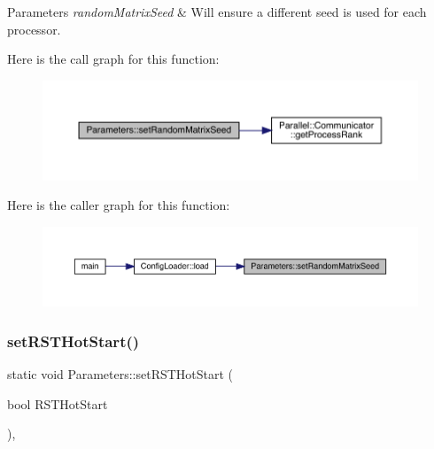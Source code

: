 \begin{DoxyParams}{Parameters}
{\em random\+Matrix\+Seed} & Will ensure a different seed is used for each processor. \\
\hline
\end{DoxyParams}
Here is the call graph for this function\+:\nopagebreak
\begin{figure}[H]
\begin{center}
\leavevmode
\includegraphics[width=350pt]{class_parameters_a46615f8286bd7363ab1f09074fdc6940_cgraph}
\end{center}
\end{figure}
Here is the caller graph for this function\+:\nopagebreak
\begin{figure}[H]
\begin{center}
\leavevmode
\includegraphics[width=350pt]{class_parameters_a46615f8286bd7363ab1f09074fdc6940_icgraph}
\end{center}
\end{figure}
\mbox{\label{class_parameters_a84d9a6f8a32bbe13f7abe045453700a0}} 
\subsubsection{\texorpdfstring{setRSTHotStart()}{setRSTHotStart()}}
{\footnotesize\ttfamily static void Parameters\+::set\+R\+S\+T\+Hot\+Start (\begin{DoxyParamCaption}\item[{bool}]{R\+S\+T\+Hot\+Start }\end{DoxyParamCaption})\hspace{0.3cm}{\ttfamily [inline]}, {\ttfamily [static]}}

